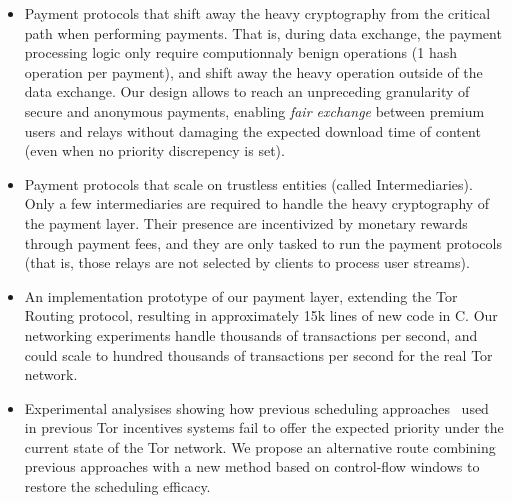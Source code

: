  \begin{itemize}
 	\item Payment protocols that shift away the heavy cryptography from the critical path when performing payments. That is, during data exchange, the payment processing logic only require computionnaly benign operations (1 hash operation per payment), and shift away the heavy operation outside of the data exchange. Our design allows to reach an unpreceding  granularity of secure and anonymous payments, enabling \textit{fair exchange} between premium users and relays without damaging the expected download time of content (even when no priority discrepency is set).
 	\item Payment protocols that scale on trustless entities (called Intermediaries). Only a few intermediaries are required to handle the heavy cryptography of the payment layer. Their presence are incentivized by monetary rewards through payment fees, and they are only tasked to run the payment protocols (that is, those relays are not selected by clients to process user streams).
 	
 	\item An implementation prototype of our payment layer, extending the Tor Routing protocol, resulting in approximately 15k lines of new code in C. Our networking experiments handle thousands of transactions per second, and could scale to hundred thousands of transactions per second for the real Tor network.
 	
 	\item Experimental analysises showing how previous scheduling approaches~\cite{dovrolis1999case, tang2010improved} used in previous Tor incentives systems fail to offer the expected priority under the current state of the Tor network. We propose an alternative route combining previous approaches with a new method based on control-flow windows to restore the scheduling efficacy.
 \end{itemize}
 

